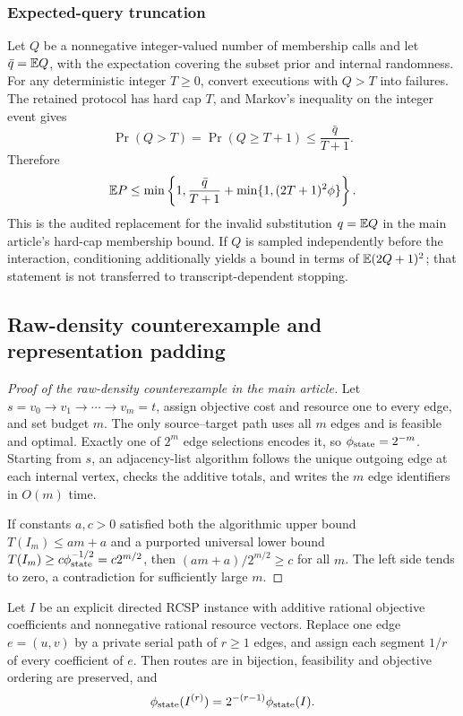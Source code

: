 \subsubsection{Expected-query truncation}
\label{app:expected-query}

Let $Q$ be a nonnegative integer-valued number of membership calls and let
$\bar q=\mathbb{E} Q$, with the expectation covering the subset prior and internal
randomness. For any deterministic integer $T\geq0$, convert executions with
$Q>T$ into failures. The retained protocol has hard cap $T$, and Markov's
inequality on the integer event gives
\begin{equation}
  \Pr(Q>T)=\Pr(Q\geq T+1)\leq\frac{\bar q}{T+1}.
\end{equation}
Therefore
\begin{equation}
 \mathbb{E} P\leq\min\left\{1,
 \frac{\bar q}{T+1}
 +\min\{1,(2T+1)^2\phi\}\right\}.
 \label{eq:expected-query-truncation}
\end{equation}
This is the audited replacement for the invalid substitution
$q=\mathbb{E} Q$ in the main article's hard-cap membership bound. If $Q$ is sampled independently
before the interaction, conditioning additionally yields a bound in terms of
$\mathbb{E}(2Q+1)^2$; that statement is not transferred to transcript-dependent
stopping.

\subsection{Raw-density counterexample and representation padding}

\begin{proof}[Proof of the raw-density counterexample in the main article]
Let
$s=v_0\to v_1\to\cdots\to v_m=t$, assign objective cost and resource one to
every edge, and set budget $m$. The only source--target path uses all $m$
edges and is feasible and optimal. Exactly one of $2^m$ edge selections
encodes it, so $\phi_{\mathrm{state}}=2^{-m}$. Starting from $s$, an adjacency-list
algorithm follows the unique outgoing edge at each internal vertex, checks
the additive totals, and writes the $m$ edge identifiers in $O(m)$ time.

If constants $a,c>0$ satisfied both the algorithmic upper bound
$T(I_m)\leq am+a$ and a purported universal lower bound
$T(I_m)\geq c\phi_{\mathrm{state}}^{-1/2}=c2^{m/2}$, then
$(am+a)/2^{m/2}\geq c$ for all $m$. The left side tends to zero, a
contradiction for sufficiently large $m$.
\end{proof}

\begin{lemma}
Let $I$ be an explicit directed RCSP instance with additive rational
objective coefficients and nonnegative rational resource vectors. Replace one
edge $e=(u,v)$ by a private serial path of $r\geq1$ edges, and assign each
segment $1/r$ of every coefficient of $e$. Then routes are in bijection,
feasibility and objective ordering are preserved, and
\begin{equation}
 \phi_{\mathrm{state}}(I^{(r)})=2^{-(r-1)}\phi_{\mathrm{state}}(I).
\end{equation}
\label{lem:padding}
\end{lemma}

